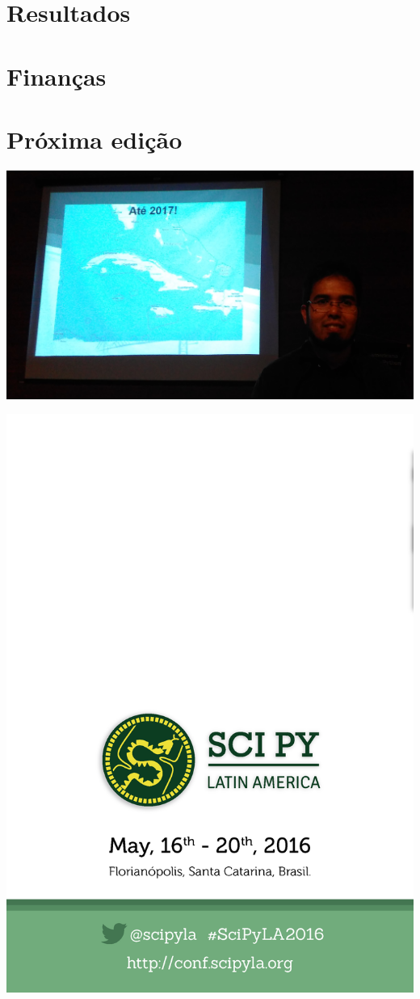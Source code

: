\documentclass[12pt]{article}
\begin{document}
\section*{Resultados}

\newpage

\section*{Finanças}

\newpage

\section*{Próxima edição}

\noindent  %
\includegraphics[width=\textwidth]{2017.jpg}

\newpage

\thispagestyle{empty}
\noindent  %
\includegraphics{../../assets/contra-capa}
\NoBgThispage
\end{document}
